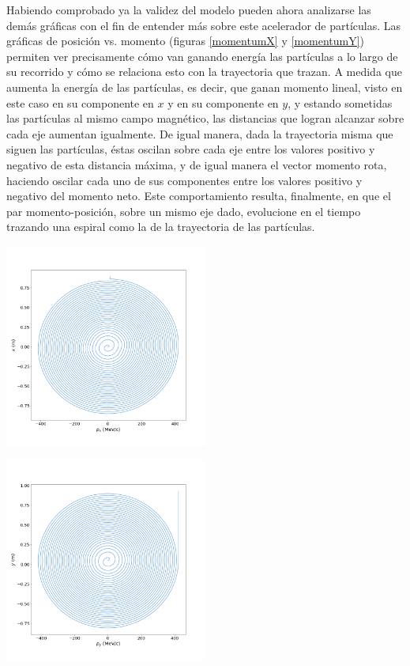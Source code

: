 \documentclass[letterpaper, 11pt]{article}
\begin{document}
\begin{multicols}{2}
Habiendo comprobado ya la validez del modelo pueden ahora analizarse las demás gráficas con el fin de entender más sobre este acelerador de partículas. Las gráficas de posición vs. momento (figuras \ref{momentumX} y \ref{momentumY}) permiten ver precisamente cómo van ganando energía las partículas a lo largo de su recorrido y cómo se relaciona esto con la trayectoria que trazan. A medida que aumenta la energía de las partículas, es decir, que ganan momento lineal, visto en este caso en su componente en $x$ y en su componente en $y$, y estando sometidas las partículas al mismo campo magnético, las distancias que logran alcanzar sobre cada eje aumentan igualmente. De igual manera, dada la trayectoria misma que siguen las partículas, éstas oscilan sobre cada eje entre los valores positivo y negativo de esta distancia máxima, y de igual manera el vector momento rota, haciendo oscilar cada uno de sus componentes entre los valores positivo y negativo del momento neto. Este comportamiento resulta, finalmente, en que el par momento-posición, sobre un mismo eje dado, evolucione en el tiempo trazando una espiral como la de la trayectoria de las partículas.

\begin{center}
    \includegraphics[width=0.5\textwidth]{momentum_x.png}
    \label{momentumX}
\end{center}

\begin{center}
    \includegraphics[width=0.5\textwidth]{momentum_y.png}
    \label{momentumY}
\end{center}


\end{multicols}
\end{document}
